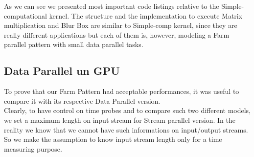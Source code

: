 	As we can see we presented most important code listings relative to the Simple-computational kernel. The structure and the implementation to execute Matrix multiplication and Blur Box are similar to Simple-comp kernel, since they are really different applications but each of them is, however, modeling a Farm parallel pattern with small data parallel tasks.

\subsection{Data Parallel un GPU}
	To prove that our Farm Pattern had acceptable performances, it was useful to compare it with its respective Data Parallel version.\\
	Clearly, to have control on time probes and to compare such two different models, we set a maximum length on input stream for Stream parallel version. In the reality we know that we cannot have such informations on input/output streams. So we make the assumption to know input stream length only for a time measuring purpose.
	
